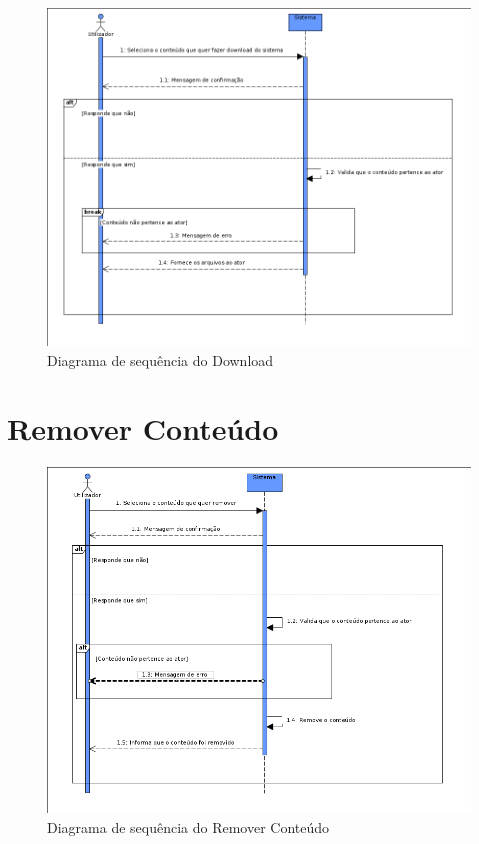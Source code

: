 \documentclass[a4paper]{report}
\begin{document}
\begin{figure}[H]
	\centering 
    \includegraphics[width=\textwidth]{images/downloadSeq.png}  
    \caption{Diagrama de sequência do Download}
\end{figure}

\section{Remover Conteúdo}

\begin{figure}[H]
	\centering 
    \includegraphics[width=\textwidth]{images/remconteudoSeq.png}  
    \caption{Diagrama de sequência do Remover Conteúdo}
\end{figure}
\end{document}
